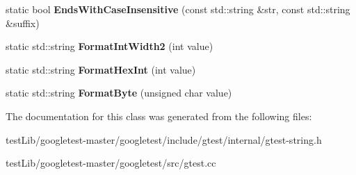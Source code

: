 \begin{DoxyCompactItemize}
\mbox{\label{classtesting_1_1internal_1_1String_a968f242b709f8c7c0ed5ecf246553321}} 
static bool {\bfseries Ends\+With\+Case\+Insensitive} (const std\+::string \&str, const std\+::string \&suffix)
\item 
\mbox{\label{classtesting_1_1internal_1_1String_af50b18d588355871e1982c4043523e0f}} 
static std\+::string {\bfseries Format\+Int\+Width2} (int value)
\item 
\mbox{\label{classtesting_1_1internal_1_1String_affe59102e49092fc0684388e9b0c5c1e}} 
static std\+::string {\bfseries Format\+Hex\+Int} (int value)
\item 
\mbox{\label{classtesting_1_1internal_1_1String_af702dc7cbd569589d8e3ff215a7cafa9}} 
static std\+::string {\bfseries Format\+Byte} (unsigned char value)
\end{DoxyCompactItemize}


The documentation for this class was generated from the following files\+:\begin{DoxyCompactItemize}
\item 
test\+Lib/googletest-\/master/googletest/include/gtest/internal/gtest-\/string.\+h\item 
test\+Lib/googletest-\/master/googletest/src/gtest.\+cc\end{DoxyCompactItemize}
